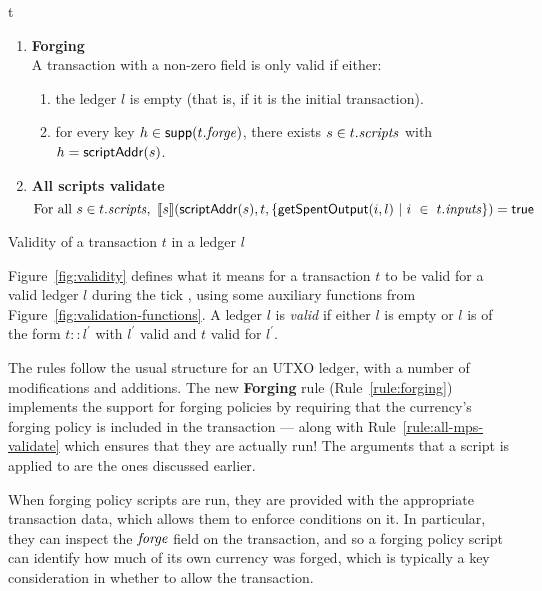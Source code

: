 \begin{ruledfigure}{t}
\begin{enumerate}
\item
  \label{rule:forging}
  \textbf{Forging}\\
  A transaction with a non-zero \forge{} field is only
  valid if either:
  \begin{enumerate}
  \item the ledger $l$ is empty (that is, if it is the initial transaction).
  \item \label{rule:custom-forge}
    for every key $h \in \mathsf{supp}(t.\mathit{forge})$, there
    exists $s \in t.\mathit{scripts}$ with
    $h = \mathsf{scriptAddr}(s)$.
  \end{enumerate}
  \medskip

\item
  \label{rule:all-mps-validate}
  \textbf{All scripts validate}
  \begin{displaymath}
    \textrm{For all } s \in t.\mathit{scripts},\ \llbracket s\rrbracket(\mathsf{scriptAddr}(s), t,
    \{\mathsf{getSpentOutput}(i, l) ~\vert~ i~\in~ t.\mathit{inputs}\}) = \textsf{true}
  \end{displaymath}

\end{enumerate}
\caption{Validity of a transaction $t$ in a ledger $l$}
\label{fig:validity}
\end{ruledfigure}
%
Figure~\ref{fig:validity} defines what it means for a transaction $t$ to be valid for a valid ledger $l$ during the tick \currentTick, using some auxiliary functions from Figure~\ref{fig:validation-functions}. A ledger $l$ is \textit{valid} if either $l$ is empty or $l$ is of the form $t::l^{\prime}$ with $l^{\prime}$ valid and $t$ valid for $l^{\prime}$.

The rules follow the usual structure for an UTXO ledger, with a number of modifications and additions.
The new \textbf{Forging} rule (Rule~\ref{rule:forging}) implements the support for forging policies by requiring that the currency's forging policy is included in the transaction --- along with Rule~\ref{rule:all-mps-validate} which ensures that they are actually run!
The arguments that a script is applied to are the ones discussed earlier.

When forging policy scripts are run, they are provided with the appropriate transaction data, which allows them to enforce conditions on it.
In particular, they can inspect the $\mathit{forge}$ field on the transaction, and so a forging policy script can identify how much of its own currency was forged, which is typically a key consideration in whether to allow the transaction.

